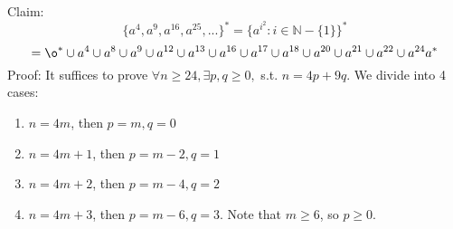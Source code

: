 \documentclass[10pt,a4paper]{article}
\begin{document}
Claim: 
\[\{a^4,a^9,a^{16},a^{25},...\}^* = \{a^{i^2}:i\in\mathbb{N}-\{1\}\}^*\]
\[=\o^*\cup a^4\cup a^8\cup a^9\cup a^{12}\cup a^{13}\cup a^{16}\cup a^{17}\cup a^{18}\cup a^{20}\cup a^{21}\cup a^{22}\cup a^{24}a^*\]
Proof:
It suffices to prove $\forall n\ge 24,\exists p,q\ge 0,$ s.t. $n=4p+9q$. We divide into 4 cases:
\begin{enumerate}
	\item $n=4m$, then $p=m,q=0$
	\item $n=4m+1$, then $p=m-2,q=1$
	\item $n=4m+2$, then $p=m-4,q=2$
	\item $n=4m+3$, then $p=m-6,q=3$. Note that $m\ge 6$, so $p\ge 0$.
\end{enumerate}
\end{document}
